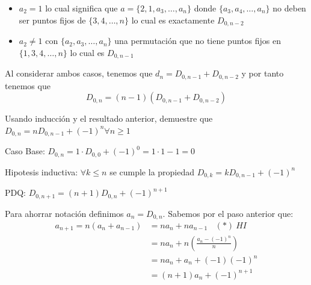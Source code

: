 \documentclass[letterpaper,10pt,table, dvipsnames]{article}
\begin{document}
\begin{itemize}
  \item $a_{2}=1$ lo cual significa que $a=\{2,1,a_3,\ldots,a_n\}$ donde $\{a_3, a_4, \ldots, a_n\}$ no deben ser puntos fijos de $\{3,4, \ldots, n\}$ lo cual es exactamente $D_{0,n-2} $
  \item $a_{2}\neq 1 $ con $\{a_2,a_3,\ldots,a_n\} $ una permutación que no tiene puntos fijos en $\{1,3,4,\ldots,n\} $ lo cual es $D_{0,n-1} $
\end{itemize}

Al considerar ambos casos, tenemos que $d_n=D_{0,n-1} + D_{0,n-2} $ y por tanto tenemos que $$D_{0,n}=(n-1)(D_{0,n-1} + D_{0,n-2})$$



\begin{tcolorbox}
 Usando inducción y el resultado anterior, demuestre que $D_{0,n} = n D_{0,n-1} + (-1)^n \forall n \geq 1$
\end{tcolorbox}

Caso Base: $D_{0,n}= 1 \cdot D_{0,0} + (-1)^0 = 1\cdot 1 -1 = 0$

Hipotesis inductiva: $\forall k \leq n$ se cumple la propiedad $D_{0,k} = k D_{0,n-1} + (-1)^n$

PDQ: $D_{0,n+1} = (n+1) D_{0,n} + (-1)^{n+1} $

Para ahorrar notación definimos $a_n = D_{0,n} $. Sabemos por el paso anterior que:
\begin{align*}
a_{n+1} = n(a_{n} + a_{n-1}) &=na_n + na_{n-1}\ \ \ \ (*)\ HI  \\
&=na_n + n \left(\frac{a_n - (-1)^n}{n}\right) \\
&=na_n + a_n + (-1)(-1)^{n}\\
&=(n+1) a_n + (-1)^{n+1}
\end{align*}
\end{document}

